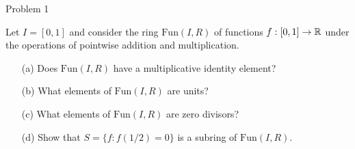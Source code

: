 \documentclass{hmwk}
\begin{document}
\maketitle

\begin{problem}{Problem 1}

\pre Let $I = [0,1]$ and consider the ring $\mathrm{Fun}(I, R)$ of functions $f: [0,1] \to \mathbb{R}$ under the operations of pointwise addition and multiplication.

\begin{itemize}
    \item[(a)] Does $\mathrm{Fun}(I, R)$ have a multiplicative identity element?
    \item[(b)] What elements of $\mathrm{Fun}(I, R)$ are units?
    \item[(c)] What elements of $\mathrm{Fun}(I, R)$ are zero divisors?
    \item[(d)] Show that $S = \{ f : f(1/2) = 0\}$ is a subring of $\mathrm{Fun}(I, R)$.
\end{itemize}
    
\end{problem}
\end{document}
